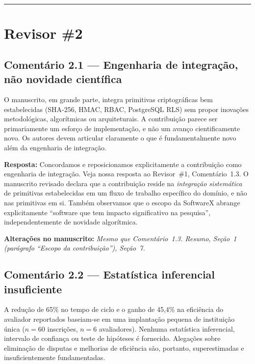 \documentclass[11pt,a4paper]{article}
\newcommand{\response}[1]{\par\noindent\textcolor{responsecolor}{\textbf{Resposta:}} #1}
\newcommand{\change}[1]{\par\noindent\textcolor{changecolor}{\textbf{Alterações no manuscrito:}} \textit{#1}}
\begin{document}
\bigskip
\hrule
\bigskip

\section*{Revisor \#2}

\subsection*{Comentário 2.1 --- Engenharia de integração, não novidade científica}

\begin{reviewerbox}
O manuscrito, em grande parte, integra primitivas criptográficas bem estabelecidas (SHA-256, HMAC, RBAC, PostgreSQL RLS) sem propor inovações metodológicas, algorítmicas ou arquiteturais. A contribuição parece ser primariamente um esforço de implementação, e não um avanço cientificamente novo. Os autores devem articular claramente o que é fundamentalmente novo além da engenharia de integração.
\end{reviewerbox}

\response{Concordamos e reposicionamos explicitamente a contribuição como engenharia de integração. Veja nossa resposta ao Revisor~\#1, Comentário~1.3. O manuscrito revisado declara que a contribuição reside na \emph{integração sistemática} de primitivas estabelecidas em um fluxo de trabalho específico do domínio, e não nas primitivas em si. Também observamos que o escopo da SoftwareX abrange explicitamente ``software que tem impacto significativo na pesquisa'', independentemente de novidade algorítmica.}

\change{Mesmo que Comentário~1.3. Resumo, Seção~1 (parágrafo ``Escopo da contribuição''), Seção~7.}

\bigskip

\subsection*{Comentário 2.2 --- Estatística inferencial insuficiente}

\begin{reviewerbox}
A redução de 65\% no tempo de ciclo e o ganho de 45,4\% na eficiência do avaliador reportados baseiam-se em uma implantação pequena de instituição única ($n=60$ inscrições, $n=6$ avaliadores). Nenhuma estatística inferencial, intervalo de confiança ou teste de hipóteses é fornecido. Alegações sobre eliminação de disputas e melhorias de eficiência são, portanto, superestimadas e insuficientemente fundamentadas.
\end{reviewerbox}
\end{document}

